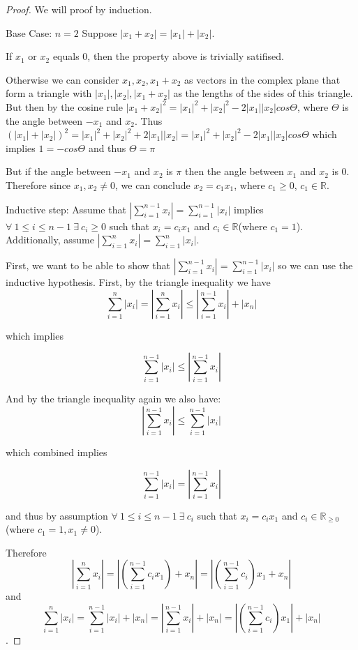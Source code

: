 \documentclass{amsart}
\theoremstyle{definition}
\theoremstyle{remark}
\numberwithin{equation}{section}
\begin{document}
\begin{proof}
We will proof by induction.

Base Case: $n = 2$
Suppose $|x_1 + x_2| = |x_1| + |x_2|$.

If $x_1$ or $x_2$ equals $0$, then the property above is trivially satifised.


Otherwise we can consider $x_1, x_2, x_1 + x_2$ as vectors in the complex plane that form a triangle with $|x_1|, |x_2|, |x_1 + x_2| $ as the lengths of the sides of this triangle.
But then by the cosine rule $|x_1 + x_2|^2 = |x_1|^2 + |x_2|^2 - 2|x_1||x_2|cos\Theta$, where $\Theta$ is the angle between $-x_1$ and $x_2$.
Thus $(|x_1| + |x_2|)^2 = |x_1|^2 + |x_2|^2 + 2|x_1||x_2| = |x_1|^2 + |x_2|^2 - 2|x_1||x_2|cos\Theta$
which implies $1 = -cos\Theta$ and thus $\Theta = \pi$

But if the angle between $-x_1$ and $x_2$ is $\pi$  then the angle between $x_1$ and $x_2$ is $0$.
Therefore since $x_1, x_2 \neq 0$, we can conclude $x_2 = c_1x_1$, where $c_1 \geq 0$, $c_1 \in \mathbb{R}$.


Inductive step:
Assume that $|\sum_{i = 1}^{n-1} x_i| = \sum_{i = 1}^{n-1}| x_i|$ implies $\forall\ 1 \leq i \leq n-1\ \exists\ c_i \geq 0$ such that $x_i = c_ix_1$ and $c_i \in \mathbb{R}$(where $c_1 = 1$).  Additionally, assume $|\sum_{i = 1}^{n} x_i| = \sum_{i = 1}^{n}| x_i|$.

First, we want to be able to show that $|\sum_{i = 1}^{n-1} x_i| = \sum_{i = 1}^{n-1}| x_i|$ so we can use the inductive hypothesis.
First, by the triangle inequality we have
$$\sum_{i = 1}^{n}| x_i| = |\sum_{i = 1}^{n} x_i|  \leq |\sum_{i = 1}^{n-1} x_i| + | x_n|$$

which implies 

$$ \sum_{i = 1}^{n-1}| x_i| \leq |\sum_{i = 1}^{n-1} x_i|$$


And by the triangle inequality again we also have:
$$ |\sum_{i = 1}^{n-1} x_i| \leq \sum_{i = 1}^{n-1}| x_i|$$


which combined implies

$$\sum_{i = 1}^{n-1}| x_i| = |\sum_{i = 1}^{n-1} x_i|$$

and thus by assumption $\forall\ 1 \leq i \leq n-1\ \exists\ c_i$ such that $x_i = c_ix_1$ and $c_i \in \mathbb{R}_{\geq 0}$ (where $c_1 = 1, x_1 \neq 0$).

Therefore 
$$|\sum_{i = 1}^{n} x_i| = |(\sum_{i = 1}^{n-1} c_ix_1) + x_n| = |(\sum_{i = 1}^{n-1} c_i)x_1 + x_n|$$
and
$$\sum_{i = 1}^{n}| x_i| = \sum_{i = 1}^{n-1}| x_i| + |x_n| = |\sum_{i = 1}^{n-1} x_i| + |x_n| = |(\sum_{i = 1}^{n-1}c_i )x_1| + |x_n| $$.


\end{proof}
\end{document}
